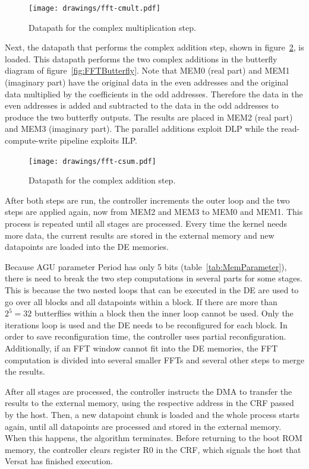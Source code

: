 \begin{figure}[!htb]
\centering \texttt{[image: drawings/fft-cmult.pdf]}
\caption{Datapath for the complex multiplication step.}
\label{fig:complexMultiplication}
\end{figure}

Next, the datapath that performs the complex addition step, shown in
figure~\ref{fig:complexSum}, is loaded. This datapath performs the two
complex additions in the butterfly diagram of
figure~\ref{fig:FFTButterfly}. Note that MEM0 (real part) and MEM1
(imaginary part) have the original data in the even addresses and the
original data multiplied by the coefficients in the odd
addresses. Therefore the data in the even addresses is added and
subtracted to the data in the odd addresses to produce the two
butterfly outputs. The results are placed in MEM2 (real part) and MEM3
(imaginary part). The parallel additions exploit DLP while the
read-compute-write pipeline exploits ILP.

\begin{figure}[!htb]
\centering \texttt{[image: drawings/fft-csum.pdf]}
\caption{Datapath for the complex addition step.}
\label{fig:complexSum}
\end{figure}

After both steps are run, the controller increments the outer loop and
the two steps are applied again, now from MEM2 and MEM3 to MEM0 and
MEM1. This process is repeated until all stages are processed. Every
time the kernel needs more data, the current results are stored in the
external memory and new datapoints are loaded into the DE memories.

Because AGU parameter Period has only 5 bits
(table~\ref{tab:MemParameter}), there is need to break the two step
computations in several parts for some stages. This is because the two
nested loops that can be executed in the DE are used to go over all
blocks and all datapoints within a block. If there are more than
$2^5=32$ butterflies within a block then the inner loop cannot be
used. Only the iterations loop is used and the DE needs to be
reconfigured for each block. In order to save reconfiguration time,
the controller uses partial reconfiguration. Additionally, if an FFT
window cannot fit into the DE memories, the FFT computation is divided
into several smaller FFTs and several other steps to merge the
results.

After all stages are processed, the controller instructs the DMA to
transfer the results to the external memory, using the respective
address in the CRF passed by the host. Then, a new datapoint chunk is
loaded and the whole process starts again, until all datapoints are
processed and stored in the external memory. When this happens, the
algorithm terminates. Before returning to the boot ROM memory, the
controller clears register R0 in the CRF, which signals the host that
Versat has finished execution.

